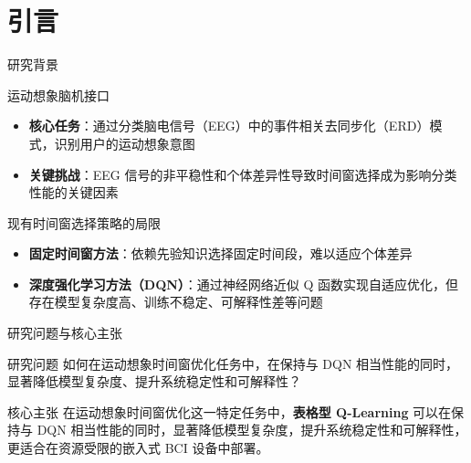 \section{引言}

\begin{frame}{研究背景}
    \begin{block}{\normalsize 运动想象脑机接口}
        \begin{itemize}
            \item[\textcolor{primaryblue}{\textbullet}] \textbf{核心任务}：通过分类脑电信号（EEG）中的事件相关去同步化（ERD）模式，识别用户的运动想象意图
            \item[\textcolor{primaryblue}{\textbullet}] \textbf{关键挑战}：EEG 信号的非平稳性和个体差异性导致时间窗选择成为影响分类性能的关键因素
        \end{itemize}
    \end{block}

    \vspace{0.5em}

    \begin{alertblock}{\normalsize 现有时间窗选择策略的局限}
        \begin{itemize}
            \item[\textcolor{accentred}{\textbullet}] \textbf{固定时间窗方法}：依赖先验知识选择固定时间段，难以适应个体差异
            \item[\textcolor{accentred}{\textbullet}] \textbf{深度强化学习方法（DQN）}：通过神经网络近似 Q 函数实现自适应优化，但存在模型复杂度高、训练不稳定、可解释性差等问题
        \end{itemize}
    \end{alertblock}
\end{frame}

\begin{frame}{研究问题与核心主张}
    \begin{block}{\normalsize 研究问题}
        如何在运动想象时间窗优化任务中，在保持与 DQN 相当性能的同时，显著降低模型复杂度、提升系统稳定性和可解释性？
    \end{block}

    \vspace{0.5em}

    \begin{exampleblock}{\normalsize 核心主张}
        在运动想象时间窗优化这一特定任务中，\textbf{表格型 Q-Learning} 可以在保持与 DQN 相当性能的同时，显著降低模型复杂度，提升系统稳定性和可解释性，更适合在资源受限的嵌入式 BCI 设备中部署。
    \end{exampleblock}
\end{frame}


